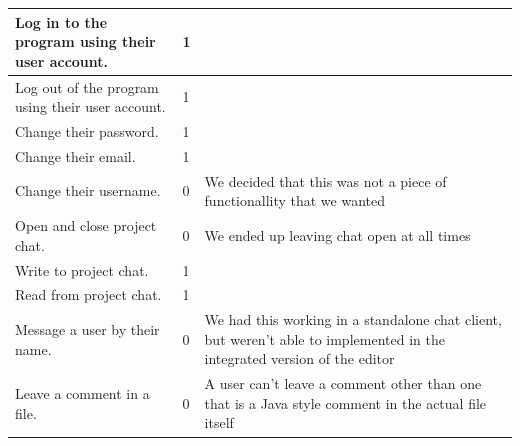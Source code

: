 \documentclass[twoside,letterpaper]{article}
\begin{document}
\begin{tabular}{|p{6cm}|p{2.5cm}|p{8cm}|}
Log in to the program using their user account.                                        & 1                     &                                                                                                                          \\ \hline
Log out of the program using their user account.                                       & 1                     &                                                                                                                          \\ \hline
Change their password.                                                                 & 1                     &                                                                                                                          \\ \hline
Change their email.                                                                    & 1                     &                                                                                                                          \\ \hline
Change their username.                                                                 & 0                     & We decided that this was not a piece of functionallity that we wanted                                                    \\ \hline
Open and close project chat.                                                           & 0                     & We ended up leaving chat open at all times                                                                               \\ \hline
Write to project chat.                                                                 & 1                     &                                                                                                                          \\ \hline
Read from project chat.                                                                & 1                     &                                                                                                                          \\ \hline
Message a user by their name.                                                          & 0                     & We had this working in a standalone chat client, but weren't able to implemented in the integrated version of the editor \\ \hline
Leave a comment in a file.                                                             & 0                     & A user can't leave a comment other than one that is a Java style comment in the actual file itself                       \\ \hline

\end{tabular}
\end{document}

